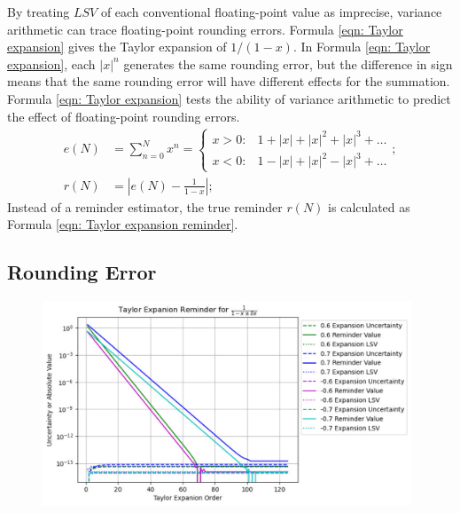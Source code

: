 \documentclass[twoside]{article}
\numberwithin{equation}{section}
\begin{document}
By treating $LSV$ of each conventional floating-point value as imprecise, variance arithmetic can trace floating-point rounding errors.
Formula \eqref{eqn: Taylor expansion} gives the Taylor expansion of $1/(1 - x)$.
In Formula \eqref{eqn: Taylor expansion}, each $|x|^n$ generates the same rounding error, but the difference in sign means that the same rounding error will have different effects for the summation. 
Formula \eqref{eqn: Taylor expansion} tests the ability of variance arithmetic to predict the effect of floating-point rounding errors.
\begin{align}
\label{eqn: Taylor expansion}
e(N) &= \sum_{n = 0}^{N} x^n = \begin{cases} 
x > 0: &1 + |x| + |x|^2 + |x|^3 + \dots \\
x < 0: & 1 - |x| + |x|^2 - |x|^3 + \dots
\end{cases}; \\
\label{eqn: Taylor expansion reminder}
r(N) & = \left| e(N) - \frac{1}{1-x} \right|;
\end{align}
Instead of a reminder estimator, the true reminder $r(N)$ is calculated as Formula \eqref{eqn: Taylor expansion reminder}.



\subsection{Rounding Error}

\begin{figure}[p]
\centering
\includegraphics[height=2.4in]{Taylor_Expansion_Uncertainty.pdf} 
\label{fig: Taylor_Expansion_Uncertainty}
\end{figure}
\end{document}
